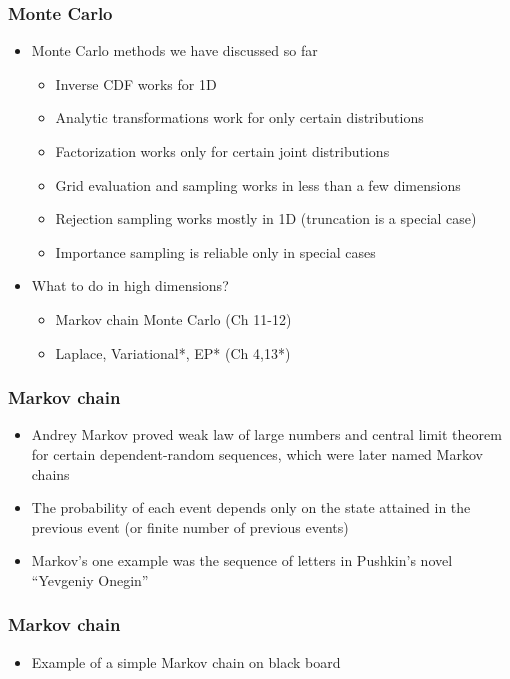 \documentclass[10pt,handout]{beamer}
\begin{document}
\begin{frame}

\frametitle{ Monte Carlo}

  \begin{itemize}
  \item Monte Carlo methods we have discussed so far
    \begin{itemize}
    \item Inverse CDF works for 1D
    \item Analytic transformations work for only certain distributions
    \item Factorization works only for certain joint distributions
    \item Grid evaluation and sampling works in less than a few dimensions
    \item Rejection sampling works mostly in 1D (truncation is a special case)
    \item Importance sampling is reliable only in special cases
    \end{itemize}
    \pause
  \item What to do in high dimensions?
    \begin{itemize}
    \item Markov chain Monte Carlo (Ch 11-12)
    \item Laplace, Variational*, EP* (Ch 4,13*)
    \end{itemize}
  \end{itemize}
\end{frame}


\begin{frame}

\frametitle{ Markov chain}

  \begin{itemize}
  \item<1-> Andrey Markov proved weak law of large numbers and central
    limit theorem for certain dependent-random sequences, which were
    later named Markov chains
  \item<2-> The probability of each event depends only on the state
    attained in the previous event (or finite number of previous events)
  \item<3-> Markov's one example was the sequence of letters in
    Pushkin's novel ``Yevgeniy Onegin''
  \end{itemize}

\end{frame}


\begin{frame}

\frametitle{ Markov chain}

  \begin{itemize}
  \item Example of a simple Markov chain on black board
  \end{itemize}

\end{frame}
\end{document}
